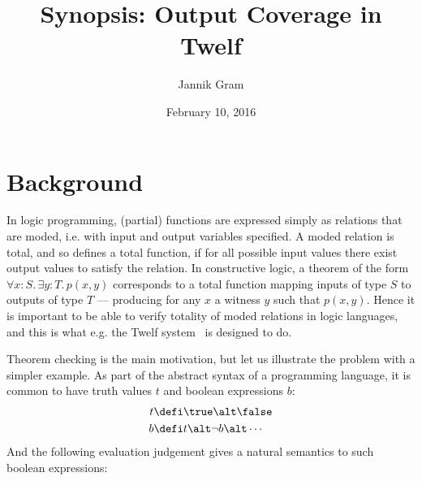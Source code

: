 \documentclass[12pt]{article}
\begin{document}
\title{Synopsis: Output Coverage in Twelf}
\author{Jannik Gram}
\date{February 10, 2016}

\maketitle

\section*{Background}

In logic programming, (partial) functions are expressed simply as relations that are moded, i.e. with input and output variables specified.
A moded relation is total, and so defines a total function, if for all possible input values there exist output values to satisfy the relation.
In constructive logic, a theorem of the form $\forall x{:}S . \, \exists y{:}T . \, p(x, y)$ corresponds to a total function mapping inputs of type $S$ to outputs of type $T$ --- producing for any $x$ a witness $y$ such that $p(x, y)$.
Hence it is important to be able to verify totality of moded relations in logic languages, and this is what e.g. the Twelf system~\cite{PfenningSchurmann99} is designed to do.

Theorem checking is the main motivation, but let us illustrate the problem with a simpler example.
As part of the abstract syntax of a programming language, it is common to have truth values $t$ and boolean expressions $b$:
\begin{align*}
  t &\defi \true \alt \false \\
  b &\defi t \alt \neg{b} \alt \cdots
\end{align*}
And the following evaluation judgement gives a natural semantics to such boolean expressions:

{ %
\vspace{0.5cm}
\noindent {}

\begin{prooftree}
\end{prooftree}

\begin{prooftree}
\end{prooftree}

\begin{prooftree}
\end{prooftree}

\centering{$\vdots$}

\vspace{0.5cm}
}
\end{document}
